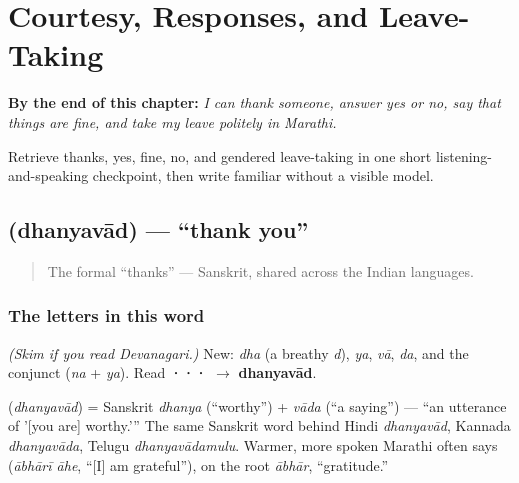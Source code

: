 
\chapter{Courtesy, Responses, and Leave-Taking}
\label{ch:greetings}

\begin{chapteropening}
\textbf{By the end of this chapter:} \emph{I can thank someone, answer yes or no, say that things are fine, and take my leave politely in Marathi.}

Retrieve thanks, yes, fine, no, and gendered leave-taking in one short listening-and-speaking checkpoint, then write familiar  without a visible model.
\end{chapteropening}

\section[dhanyavad]{ (dhanyavād) — \textquotedblleft{}thank you\textquotedblright{}}

\label{lesson:MR-C01-dhanyavad}



\begin{quote}
The formal \textquotedblleft{}thanks\textquotedblright{} — Sanskrit, shared across the Indian languages.
\end{quote}

\subsection*{The letters in this word}
\emph{(Skim if you read Devanagari.)} New: \textbf{} \emph{dha} (a breathy \emph{d}), \textbf{} \emph{ya}, \textbf{} \emph{vā}, \textbf{} \emph{da}, and the conjunct \textbf{} (\emph{na} + \emph{ya}). Read \textbf{···} $\to$ \textbf{dhanyavād}.

\begin{cousinweb}
\textbf{} (\emph{dhanyavād}) = Sanskrit \emph{dhanya} (\textquotedblleft{}worthy\textquotedblright{}) + \emph{vāda} (\textquotedblleft{}a saying\textquotedblright{}) — \textquotedblleft{}an utterance of '{[}you are{]} worthy.'\textquotedblright{} The same Sanskrit word behind Hindi \emph{dhanyavād}, Kannada \emph{dhanyavāda}, Telugu \emph{dhanyavādamulu}. Warmer, more spoken Marathi often says \textbf{ } (\emph{ābhārī āhe}, \textquotedblleft{}{[}I{]} am grateful\textquotedblright{}), on the root \emph{ābhār}, \textquotedblleft{}gratitude.\textquotedblright{}
\end{cousinweb}

